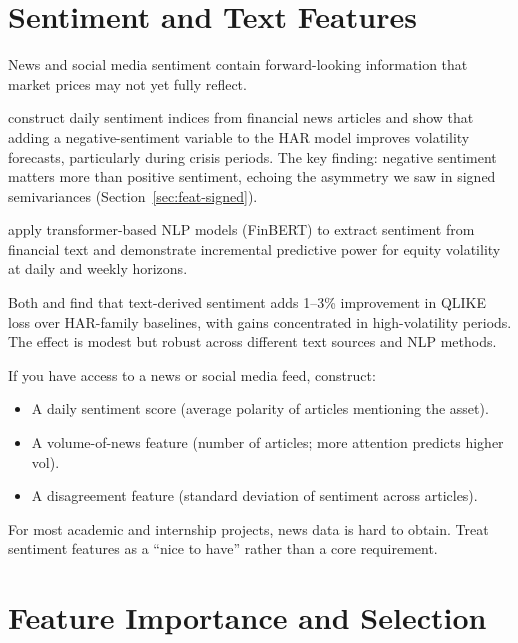 \section{Sentiment and Text Features}\label{sec:feat-sentiment}

News and social media sentiment contain forward-looking information that market prices may not yet fully reflect.

\citet{AudrinoSignristBallinari2020} construct daily sentiment indices from financial news articles and show that adding a negative-sentiment variable to the HAR model improves volatility forecasts, particularly during crisis periods.
The key finding: negative sentiment matters more than positive sentiment, echoing the asymmetry we saw in signed semivariances (Section~\ref{sec:feat-signed}).

\citet{RahimikiaZohrenPoon2021} apply transformer-based NLP models (FinBERT) to extract sentiment from financial text and demonstrate incremental predictive power for equity volatility at daily and weekly horizons.

\begin{keyresult}
Both \citet{AudrinoSignristBallinari2020} and \citet{RahimikiaZohrenPoon2021} find that text-derived sentiment adds 1--3\% improvement in QLIKE loss over HAR-family baselines, with gains concentrated in high-volatility periods.
The effect is modest but robust across different text sources and NLP methods.
\end{keyresult}

If you have access to a news or social media feed, construct:
\begin{itemize}[nosep]
  \item A daily sentiment score (average polarity of articles mentioning the asset).
  \item A volume-of-news feature (number of articles; more attention predicts higher vol).
  \item A disagreement feature (standard deviation of sentiment across articles).
\end{itemize}

For most academic and internship projects, news data is hard to obtain.
Treat sentiment features as a ``nice to have'' rather than a core requirement.

\section{Feature Importance and Selection}\label{sec:feat-importance}

